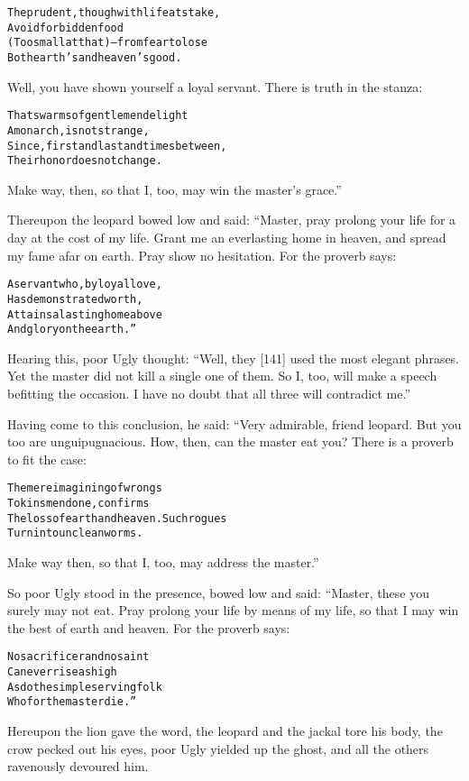 \documentclass{article}
\renewenvironment{verbatim}{\begin{alltt}\normalfont\begin{centering}}{\end{centering}\end{alltt}}
\begin{document}
\begin{verbatim}
The prudent, though with life at stake,
    Avoid forbidden food
(Too small at that)--from fear to lose
    Both earth's and heaven's good.
\end{verbatim}
Well, you have shown yourself a loyal servant. There is truth in
the stanza:

\begin{verbatim}
That swarms of gentlemen delight
    A monarch, is not strange,
Since, first and last and times between,
    Their honor does not change.
\end{verbatim}
Make way, then, so that I, too, may win the master's grace.”

Thereupon the leopard bowed low and said: “Master, pray prolong
your life for a day at the cost of my life. Grant me an everlasting
home in heaven, and spread my fame afar on earth. Pray show no
hesitation. For the proverb says:

\begin{verbatim}
A servant who, by loyal love,
    Has demonstrated worth,
Attains a lasting home above
    And glory on the earth.”
\end{verbatim}
Hearing this, poor Ugly thought:
``Well, they [141] used the most elegant phrases. Yet the master did not kill a single one of them. So I, too, will make a speech befitting the occasion. I have no doubt that all three will contradict me.''

Having come to this conclusion, he said: “Very admirable, friend
leopard. But you too are unguipugnacious. How, then, can the master
eat you? There is a proverb to fit the case:

\begin{verbatim}
The mere imagining of wrongs
    To kinsmen done, confirms
The loss of earth and heaven. Such rogues
    Turn into unclean worms.
\end{verbatim}
Make way then, so that I, too, may address the master.”

So poor Ugly stood in the presence, bowed low and said: “Master,
these you surely may not eat. Pray prolong your life by means of my
life, so that I may win the best of earth and heaven. For the
proverb says:

\begin{verbatim}
No sacrificer and no saint
    Can ever rise as high
As do the simple servingfolk
    Who for the master die.”
\end{verbatim}
Hereupon the lion gave the word, the leopard and the jackal tore
his body, the crow pecked out his eyes, poor Ugly yielded up the
ghost, and all the others ravenously devoured him.
\end{document}
